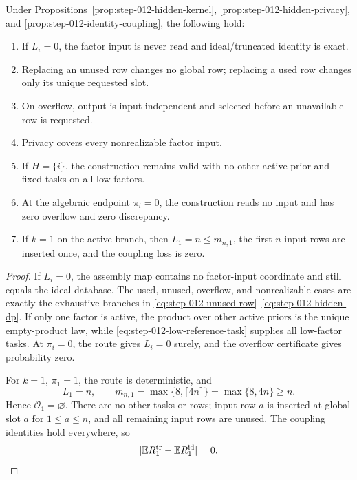 \begin{proposition}
\label{prop:step-012-boundaries}
Under Propositions~\ref{prop:step-012-hidden-kernel},
\ref{prop:step-012-hidden-privacy}, and
\ref{prop:step-012-identity-coupling}, the following hold:
\begin{enumerate}
\item If \(L_i=0\), the factor input is never read and ideal/truncated
identity is exact.
\item Replacing an unused row changes no global row; replacing a used row
changes only its unique requested slot.
\item On overflow, output is input-independent and selected before an
unavailable row is requested.
\item Privacy covers every nonrealizable factor input.
\item If \(H=\{i\}\), the construction remains valid with no other active
prior and fixed tasks on all low factors.
\item At the algebraic endpoint \(\pi_i=0\), the construction reads no
input and has zero overflow and zero discrepancy.
\item If \(k=1\) on the active branch, then \(L_1=n\le m_{n,1}\), the
first \(n\) input rows are inserted once, and the coupling loss is zero.
\end{enumerate}
\end{proposition}

\begin{proof}
If \(L_i=0\), the assembly map contains no factor-input coordinate and
still equals the ideal database.  The used, unused, overflow, and
nonrealizable cases are exactly the exhaustive branches in
\eqref{eq:step-012-unused-row}--\eqref{eq:step-012-hidden-dp}.  If only
one factor is active, the product over other active priors is the unique
empty-product law, while \eqref{eq:step-012-low-reference-task} supplies
all low-factor tasks.  At \(\pi_i=0\), the route gives \(L_i=0\) surely,
and the overflow certificate gives probability zero.

For \(k=1\), \(\pi_1=1\), the route is deterministic, and
\begin{equation}\label{eq:step-012-one-factor-budget}
L_1=n,
\qquad
m_{n,1}=\max\{8,\lceil4n\rceil\}
=\max\{8,4n\}\ge n.
\end{equation}
Hence \(\mathcal O_1=\varnothing\).  There are no other tasks or rows;
input row \(a\) is inserted at global slot \(a\) for \(1\le a\le n\),
and all remaining input rows are unused.  The coupling identities hold
everywhere, so
\begin{equation}\label{eq:step-012-one-factor-zero-loss}
|\mathbb ER_1^{\rm tr}-\mathbb ER_1^{\rm id}|=0.
\end{equation}
\end{proof}


